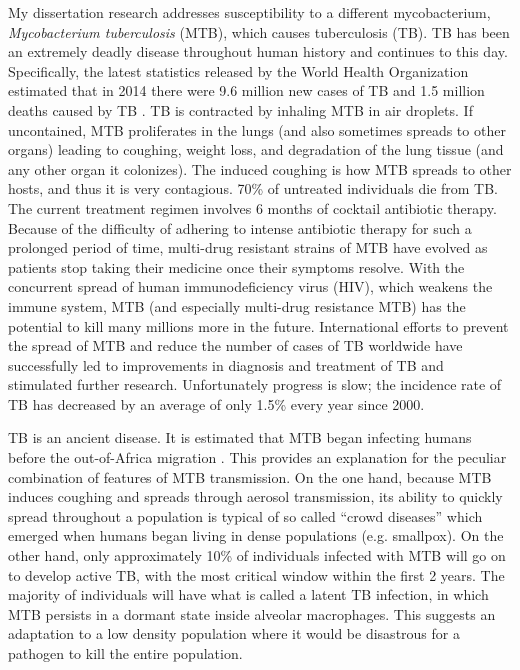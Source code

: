 My dissertation research addresses susceptibility to a different
mycobacterium, \emph{Mycobacterium tuberculosis} (MTB), which causes
tuberculosis (TB). TB has been an extremely deadly disease throughout
human history and continues to this day. Specifically, the latest
statistics released by the World Health Organization estimated that in
2014 there were 9.6 million new cases of TB and 1.5 million deaths
caused by TB \citep{WHO2015a, WHO2015b}. TB is contracted by inhaling
MTB in air droplets. If uncontained, MTB proliferates in the lungs
(and also sometimes spreads to other organs) leading to coughing,
weight loss, and degradation of the lung tissue (and any other organ
it colonizes). The induced coughing is how MTB spreads to other hosts,
and thus it is very contagious. 70\% of untreated individuals die from
TB. The current treatment regimen involves 6 months of cocktail
antibiotic therapy. Because of the difficulty of adhering to intense
antibiotic therapy for such a prolonged period of time, multi-drug
resistant strains of MTB have evolved as patients stop taking their
medicine once their symptoms resolve. With the concurrent spread of
human immunodeficiency virus (HIV), which weakens the immune system,
MTB (and especially multi-drug resistance MTB) has the potential to
kill many millions more in the future. International efforts to
prevent the spread of MTB and reduce the number of cases of TB
worldwide have successfully led to improvements in diagnosis and
treatment of TB and stimulated further research. Unfortunately
progress is slow; the incidence rate of TB has decreased by an average
of only 1.5\% every year since 2000.

TB is an ancient disease. It is estimated that MTB began infecting
humans before the out-of-Africa migration \cite{Comas2013}. This
provides an explanation for the peculiar combination of features of
MTB transmission. On the one hand, because MTB induces coughing and
spreads through aerosol transmission, its ability to quickly spread
throughout a population is typical of so called “crowd diseases” which
emerged when humans began living in dense populations
(e.g. smallpox). On the other hand, only approximately 10\% of
individuals infected with MTB will go on to develop active TB, with
the most critical window within the first 2 years. The majority of
individuals will have what is called a latent TB infection, in which
MTB persists in a dormant state inside alveolar macrophages. This
suggests an adaptation to a low density population where it would be
disastrous for a pathogen to kill the entire population.

